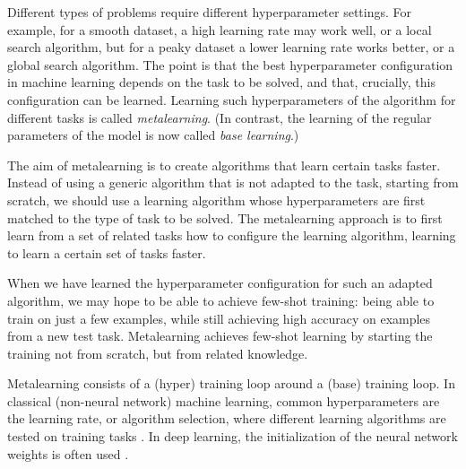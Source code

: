 Different types of problems require different hyperparameter settings. For example, for a smooth dataset, a high learning rate may work well, or a local search algorithm, but for a peaky dataset a lower learning rate works better, or a global search algorithm. The point is that the best hyperparameter configuration in machine learning depends on the task to be solved, and that, crucially, this configuration can be learned. Learning such hyperparameters of the algorithm for different tasks is called {\em metalearning}. (In contrast, the learning of the regular parameters of the model is now called {\em base learning}.) 

The aim of metalearning is to create algorithms that learn certain tasks faster. 
Instead of %
using a generic algorithm that is not  adapted to the task, starting from scratch, we should use a learning algorithm whose hyperparameters are first matched to the type of task to be solved. The metalearning approach is to first learn from a set of related tasks how to configure the learning algorithm, learning to learn a certain set of tasks faster. 


When we have learned the hyperparameter configuration for such an adapted algorithm, we may hope to be able to achieve few-shot training: being able to train on just a few examples, while still achieving high accuracy on examples from a new test task. 
%
Metalearning achieves few-shot learning by starting the training not from scratch, but from related knowledge. %


Metalearning consists of a (hyper) training loop around a (base) training loop. %
In classical (non-neural network) machine learning, common  hyperparameters are the learning rate, or algorithm selection, where different learning algorithms are tested on training tasks \citep{brazdil2022metalearning}. In deep learning,  the initialization of the neural network weights is often used \citep{finn2017model}. 

